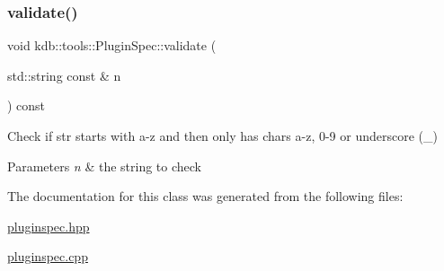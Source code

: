 \subsubsection{\texorpdfstring{validate()}{validate()}}
{\footnotesize\ttfamily void kdb\+::tools\+::\+Plugin\+Spec\+::validate (\begin{DoxyParamCaption}\item[{std\+::string const \&}]{n }\end{DoxyParamCaption}) const}



Check if str starts with a-\/z and then only has chars a-\/z, 0-\/9 or underscore (\+\_\+) 


\begin{DoxyParams}{Parameters}
{\em n} & the string to check \\
\hline
\end{DoxyParams}


The documentation for this class was generated from the following files\+:\begin{DoxyCompactItemize}
\item 
\hyperlink{pluginspec_8hpp}{pluginspec.\+hpp}\item 
\hyperlink{pluginspec_8cpp}{pluginspec.\+cpp}\end{DoxyCompactItemize}
